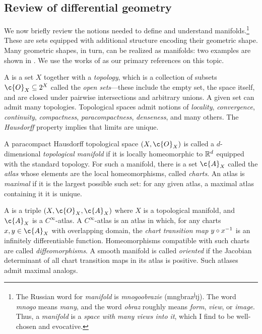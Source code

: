 \documentclass[11pt]{book}
\begin{document}
\subsection{Review of differential geometry}
We now briefly review the notions needed to define and understand manifolds.\footnote{The Russian word for \emph{manifold} is \emph{mnogoobrazie} (mngbr{\textquotesingle}az\textsuperscript{j}\textsc{i}j). The word \emph{mnogo} means \emph{many}, and the word \emph{obraz} roughly means \emph{form}, \emph{view}, or \emph{image}. 
Thus, a \emph{manifold} is a \emph{space with many views into it}, which I find to be well-chosen and evocative.}
These are sets equipped with additional structure encoding their geometric shape.
Many geometric shapes, in turn, can be realized as manifolds: two examples are shown in .
We use the works of \textcite{lee10,lee12,lee18} as our primary references on this topic.

A  is a set $X$ together with a \emph{topology}, which is a collection of subsets $\c{O}_X \subseteq 2^X$ called the \emph{open sets}---these include the empty set, the space itself, and are closed under pairwise intersections and arbitrary unions.
A given set can admit many topologies.
Topological spaces admit notions of \emph{locality}, \emph{convergence}, \emph{continuity}, \emph{compactness}, \emph{paracompactness}, \emph{denseness}, and many others.
The \emph{Hausdorff} property implies that limits are unique.

A paracompact Hausdorff topological space $(X,\c{O}_X)$ is called a $d$-dimensional \emph{topological manifold} if it is locally homeomorphic to $\mathbb{R}^d$ equipped with the standard topology.
For such a manifold, there is a set $\c{A}_X$ called the \emph{atlas} whose elements are the local homeomorphisms, called \emph{charts}.
An atlas is \emph{maximal} if it is the largest possible such set: for any given atlas, a maximal atlas containing it it is unique.

A  is a triple  $(X,\c{O}_X,\c{A}_X)$ where $X$ is a topological manifold, and $\c{A}_X$ is a $C^\infty$-atlas.
A $C^\infty$-atlas is an atlas in which, for any charts $x,y \in \c{A}_X$ with overlapping domain, the \emph{chart transition map} $y\circ x^{-1}$ is an infinitely differentiable function.
Homeomorphisms compatible with such charts are called \emph{diffeomorphisms}.
A smooth manifold is called \emph{oriented} if the Jacobian determinant of all chart transition maps in its atlas is positive.
Such atlases admit maximal analogs.
\end{document}
